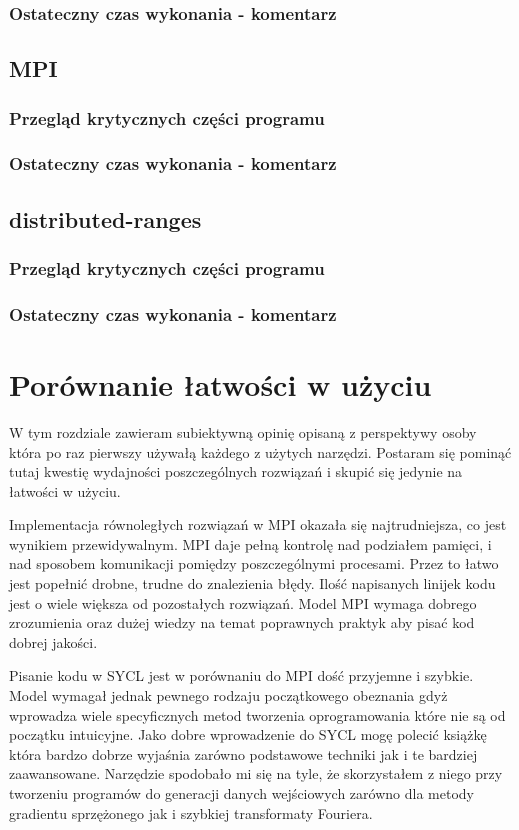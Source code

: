 \documentclass[a4paper,12pt]{book} %
\begin{document}
\subsection{Ostateczny czas wykonania - komentarz}
\section{MPI}
\subsection{Przegląd krytycznych części programu}
\subsection{Ostateczny czas wykonania - komentarz}
\section{distributed-ranges}
\subsection{Przegląd krytycznych części programu}
\subsection{Ostateczny czas wykonania - komentarz}

\chapter{Porównanie łatwości w użyciu}
W tym rozdziale zawieram subiektywną opinię opisaną z perspektywy osoby która po raz pierwszy używałą każdego z użytych narzędzi. Postaram się pominąć tutaj kwestię wydajności poszczególnych rozwiązań i skupić się jedynie na łatwości w użyciu.

Implementacja równoległych rozwiązań w MPI okazała się najtrudniejsza, co jest wynikiem przewidywalnym. MPI daje pełną kontrolę nad podziałem pamięci, i nad sposobem komunikacji pomiędzy poszczególnymi procesami. Przez to łatwo jest popełnić drobne, trudne do znalezienia błędy. Ilość napisanych linijek kodu jest o wiele większa od pozostałych rozwiązań. Model MPI wymaga dobrego zrozumienia oraz dużej wiedzy na temat poprawnych praktyk aby pisać kod dobrej jakości.

Pisanie kodu w SYCL jest w porównaniu do MPI dość przyjemne i szybkie. Model wymagał jednak pewnego rodzaju początkowego obeznania gdyż wprowadza wiele specyficznych metod tworzenia oprogramowania które nie są od początku intuicyjne. Jako dobre wprowadzenie do SYCL mogę polecić książkę \cite{sycl-book} która bardzo dobrze wyjaśnia zarówno podstawowe techniki jak i te bardziej zaawansowane. Narzędzie spodobało mi się na tyle, że skorzystałem z niego przy tworzeniu programów do generacji danych wejściowych zarówno dla metody gradientu sprzężonego jak i szybkiej transformaty Fouriera.
\end{document}
